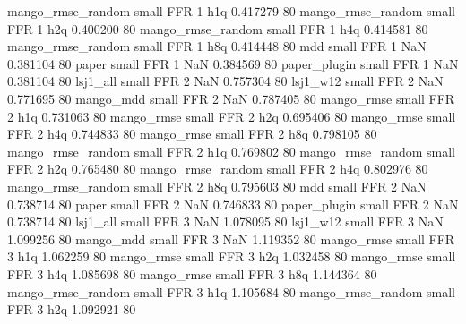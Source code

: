 mango_rmse_random      small      FFR                 1                  h1q 0.417279 80
mango_rmse_random      small      FFR                 1                  h2q 0.400200 80
mango_rmse_random      small      FFR                 1                  h4q 0.414581 80
mango_rmse_random      small      FFR                 1                  h8q 0.414448 80
              mdd      small      FFR                 1                  NaN 0.381104 80
            paper      small      FFR                 1                  NaN 0.384569 80
     paper_plugin      small      FFR                 1                  NaN 0.381104 80
         lsj1_all      small      FFR                 2                  NaN 0.757304 80
         lsj1_w12      small      FFR                 2                  NaN 0.771695 80
        mango_mdd      small      FFR                 2                  NaN 0.787405 80
       mango_rmse      small      FFR                 2                  h1q 0.731063 80
       mango_rmse      small      FFR                 2                  h2q 0.695406 80
       mango_rmse      small      FFR                 2                  h4q 0.744833 80
       mango_rmse      small      FFR                 2                  h8q 0.798105 80
mango_rmse_random      small      FFR                 2                  h1q 0.769802 80
mango_rmse_random      small      FFR                 2                  h2q 0.765480 80
mango_rmse_random      small      FFR                 2                  h4q 0.802976 80
mango_rmse_random      small      FFR                 2                  h8q 0.795603 80
              mdd      small      FFR                 2                  NaN 0.738714 80
            paper      small      FFR                 2                  NaN 0.746833 80
     paper_plugin      small      FFR                 2                  NaN 0.738714 80
         lsj1_all      small      FFR                 3                  NaN 1.078095 80
         lsj1_w12      small      FFR                 3                  NaN 1.099256 80
        mango_mdd      small      FFR                 3                  NaN 1.119352 80
       mango_rmse      small      FFR                 3                  h1q 1.062259 80
       mango_rmse      small      FFR                 3                  h2q 1.032458 80
       mango_rmse      small      FFR                 3                  h4q 1.085698 80
       mango_rmse      small      FFR                 3                  h8q 1.144364 80
mango_rmse_random      small      FFR                 3                  h1q 1.105684 80
mango_rmse_random      small      FFR                 3                  h2q 1.092921 80
